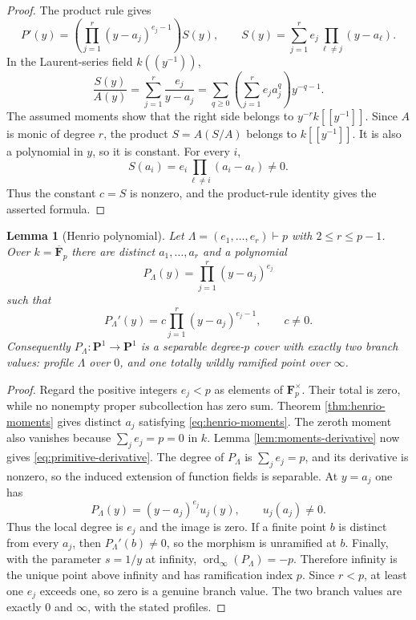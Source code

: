 \documentclass[10pt,a4paper]{amsart}
\newtheorem{lemma}[theorem]{Lemma}
\newcommand{\Fp}{\overline{\mathbf F}_{p}}
\newcommand{\PP}{\mathbf P}
\numberwithin{equation}{section}
\begin{document}
\begin{proof}
The product rule gives
\[
 P'(y)=
 \left(\prod_{j=1}^r(y-a_j)^{e_j-1}\right)S(y),
 \qquad
 S(y)=\sum_{j=1}^r e_j\prod_{\ell\ne j}(y-a_\ell).
\]
In the Laurent-series field $k((y^{-1}))$,
\[
 \frac{S(y)}{A(y)}
 =\sum_{j=1}^r\frac{e_j}{y-a_j}
 =\sum_{q\geq0}
   \left(\sum_{j=1}^r e_ja_j^q\right)y^{-q-1}.
\]
The assumed moments show that the right side belongs to
$y^{-r}k[[y^{-1}]]$.  Since $A$ is monic of degree $r$, the product
$S=A(S/A)$ belongs to $k[[y^{-1}]]$.  It is also a polynomial in $y$, so
it is constant.  For every $i$,
\[
 S(a_i)=e_i\prod_{\ell\ne i}(a_i-a_\ell)\ne0.
\]
Thus the constant $c=S$ is nonzero, and the product-rule identity gives the
asserted formula.
\end{proof}

\begin{lemma}[Henrio polynomial]\label{lem:primitive}
Let $\Lambda=(e_1,\ldots,e_r)\vdash p$ with $2\leq r\leq p-1$.
Over $k=\Fp$ there are distinct $a_1,\ldots,a_r$ and a polynomial
\[
 P_\Lambda(y)=\prod_{j=1}^r(y-a_j)^{e_j}
\]
such that
\[
 P_\Lambda'(y)=c\prod_{j=1}^r(y-a_j)^{e_j-1},\qquad c\neq0.
 \label{eq:primitive-derivative}
\]
Consequently $P_\Lambda:\PP^1\to\PP^1$ is a separable degree-$p$
cover with exactly two branch values: profile $\Lambda$ over $0$, and one
totally wildly ramified point over $\infty$.
\end{lemma}

\begin{proof}
Regard the positive integers $e_j<p$ as elements of $\mathbf F_p^\times$.
Their total is zero, while no nonempty proper subcollection has zero sum.
Theorem \ref{thm:henrio-moments} gives distinct $a_j$ satisfying
\eqref{eq:henrio-moments}.
The zeroth moment also vanishes because $\sum_j e_j=p=0$ in $k$.  Lemma
\ref{lem:moments-derivative} now gives
\eqref{eq:primitive-derivative}.  The degree of $P_\Lambda$ is
$\sum_j e_j=p$, and its derivative is nonzero, so the induced extension of
function fields is separable.  At $y=a_j$ one has
\[
 P_\Lambda(y)=(y-a_j)^{e_j}u_j(y),\qquad u_j(a_j)\ne0.
\]
Thus the local degree is $e_j$ and the image is zero.  If a finite point
$b$ is distinct from every $a_j$, then
$P_\Lambda'(b)\ne0$, so the morphism is unramified at $b$.  Finally, with
the parameter $s=1/y$ at infinity,
$\operatorname{ord}_\infty(P_\Lambda)=-p$.  Therefore infinity is the
unique point above infinity and has ramification index $p$.  Since
$r<p$, at least one $e_j$ exceeds one, so zero is a genuine branch value.
The two branch values are exactly $0$ and $\infty$, with the stated
profiles.
\end{proof}
\end{document}
